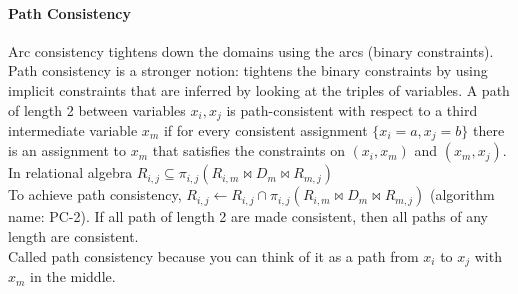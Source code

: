 \documentclass[10pt]{report}
\begin{document}
\paragraph{Path Consistency} Arc consistency tightens down the domains using the arcs (binary constraints). Path consistency is a stronger notion: tightens the binary constraints by using implicit constraints that are inferred by looking at the triples of variables. A path of length 2 between variables $x_i, x_j$ is path-consistent with respect to a third intermediate variable $x_m$ if for every consistent assignment $\{x_i = a, x_j = b\}$ there is an assignment to $x_m$ that satisfies the constraints on $(x_i, x_m)$ and $(x_m, x_j)$. In relational algebra $R_{i,j}\subseteq\pi_{i,j}(R_{i,m}\bowtie D_m\bowtie R_{m,j})$\\
To achieve path consistency, $R_{i,j}\leftarrow R_{i,j}\cap\pi_{i,j}(R_{i,m}\bowtie D_m\bowtie R_{m,j})$ (algorithm name: PC-2). If all path of length 2 are made consistent, then all paths of any length are consistent.\\
Called path consistency because you can think of it as a path from $x_i$ to $x_j$ with $x_m$ in the middle.
\end{document}
